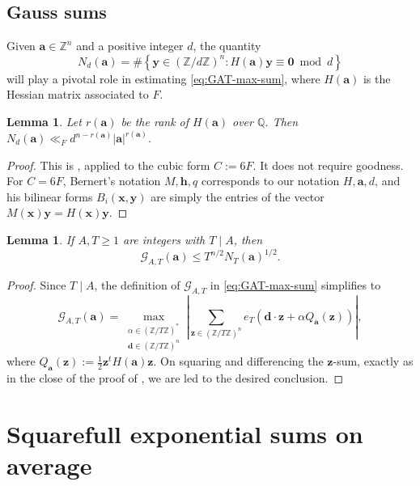 \documentclass[a4paper,11pt, twoside,reqno]{amsart}
\theoremstyle{plain}
\newtheorem{lemma}[thm]{Lemma}
\theoremstyle{definition}
\theoremstyle{remark}
\newcommand{\bfh}{\bm{h}}
\newcommand{\bfa}{\bm{a}}
\newcommand{\bfx}{\bm{x}}
\newcommand{\bfy}{\bm{y}}
\newcommand{\bfz}{\bm{z}}
\newcommand{\bfd}{\bm{d}}
\newcommand{\ZZ}{\mathbb{Z}}
\newcommand{\QQ}{\mathbb{Q}}
\renewcommand{\le}{\leqslant}
\renewcommand{\ge}{\geqslant}
\numberwithin{equation}{section}
\begin{document}
\subsection{Gauss sums}

Given $\bm{a}\in \ZZ^n$ and a positive integer $d$, the quantity
\begin{equation}\label{eq:N_d}
N_d(\bm{a})=\#\left\{ \bm{y}\in (\ZZ/d\ZZ)^n: H(\bm{a})\bm{y}\equiv \bm{0} \bmod{d}\right\}
\end{equation}
will play a pivotal role in estimating \eqref{eq:GAT-max-sum},
where $H(\bm{a})$ is the Hessian matrix associated to $F$. 

\begin{lemma}
\label{Bernert-Smith-bound}
Let $r(\bfa)$ be the rank of $H(\bfa)$ over $\QQ$.
Then $N_d(\bfa) \ll_F d^{n-r(\bfa)} |\bfa|^{r(\bfa)}$.
\end{lemma}

\begin{proof}
This is \cite[Eq.~(3.1)]{Ber25},
applied to the cubic form $C := 6F$.
It does not require goodness.
For $C=6F$,
Bernert's notation $M,\bfh,q$ corresponds to our notation $H,\bfa,d$,
and his bilinear forms $B_i(\bfx,\bfy)$
are simply the entries of the vector $M(\bfx)\bfy = H(\bfx)\bfy$.
\end{proof}

\begin{lemma}
\label{LEM:square-and-diff}
If $A,T\ge 1$ are integers with $T\mid A$, then
\begin{equation*}
\mathcal G_{A,T}(\bfa)
\le T^{n/2} N_T(\bfa)^{1/2}.
\end{equation*}
\end{lemma}

\begin{proof}
Since $T\mid A$,
the definition of $\mathcal G_{A,T}$ in \eqref{eq:GAT-max-sum} simplifies to
\[
\mathcal G_{A,T}(\bfa)
= \max_{\substack{\alpha\in (\ZZ/T\ZZ)^\ast\\
\bfd\in (\ZZ/T\ZZ)^n}}
\left|
\sum_{\bfz\in (\ZZ/T\ZZ)^n}
e_T(\bfd\cdot\bfz+\alpha Q_{\bfa}(\bfz))
\right|,
\]
where $Q_{\bfa}(\bfz):=\frac12\bfz^tH(\bfa)\bfz$.
On squaring and differencing the $\bfz$-sum, exactly as in the close of the proof of
\cite[Lemma~11]{41}, we are led to the desired conclusion.
\end{proof}

\section{Squarefull exponential sums on average}
\label{sec:squarefull-average}
\end{document}
